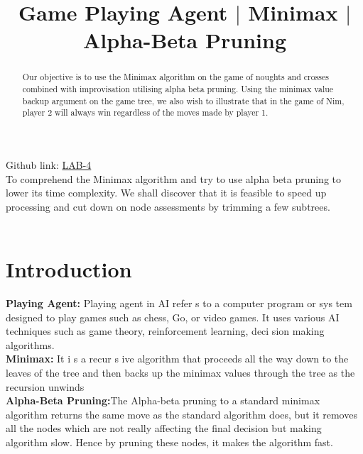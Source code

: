 \documentclass[conference]{IEEEtran}
\begin{document}
\title{Game Playing Agent $|$ Minimax $|$ Alpha-Beta Pruning}
\author{
\and
{}
\and
{}
\and
{}
}
\maketitle
\setlength{\parindent}{20pt}
\noindent Github link: \href{https://github.com/JARVIS-codebase/LAB-4}{LAB-4} \\ 
\indent To comprehend the Minimax algorithm and try to use alpha beta pruning to lower its time complexity. We shall discover that it is feasible to speed up processing and cut down on node assessments by trimming a few subtrees.\\ \\
\indent \begin{abstract}
Our objective is to use the Minimax algorithm on the game of noughts and crosses combined with improvisation utilising alpha beta pruning. Using the minimax value backup argument on the game tree, we also wish to illustrate that in the game of Nim, player 2 will always win regardless of the moves made by player 1.
\end{abstract}

\IEEEpeerreviewmaketitle

\section{Introduction}
\textbf{Playing Agent:} Playing agent in AI refer s to a computer program or sys tem designed to play games such as chess, Go, or video games. It uses various AI techniques such as game theory, reinforcement learning, deci sion making algorithms.\\
\textbf{Minimax:} It i s a recur s ive algorithm that proceeds all the way down to the leaves of the tree and then backs up the minimax values
through the tree as the recursion unwinds\\
\textbf{Alpha-Beta Pruning:}The Alpha-beta pruning to a standard minimax algorithm returns the same move as the standard algorithm does, but it removes all the nodes which are not really affecting the final decision but making algorithm slow. Hence by pruning these nodes, it makes the algorithm fast.\\
\end{document}
